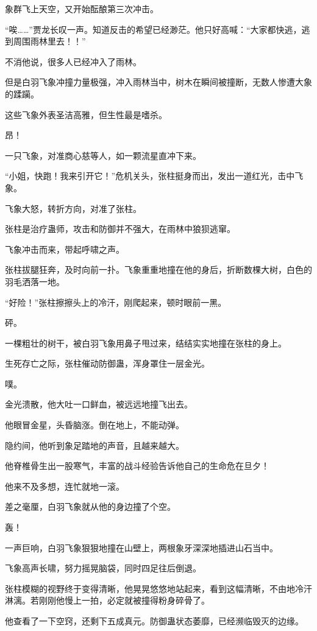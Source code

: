 \begin{this_body}
象群飞上天空，又开始酝酿第三次冲击。

“唉……”贾龙长叹一声。知道反击的希望已经渺茫。他只好高喊：“大家都快逃，逃到周围雨林里去！！”

不消他说，很多人已经冲入了雨林。

但是白羽飞象冲撞力量极强，冲入雨林当中，树木在瞬间被撞断，无数人惨遭大象的蹂躏。

这些飞象外表圣洁高雅，但生性最是嗜杀。

昂！

一只飞象，对准商心慈等人，如一颗流星直冲下来。

“小姐，快跑！我来引开它！”危机关头，张柱挺身而出，发出一道红光，击中飞象。

飞象大怒，转折方向，对准了张柱。

张柱是治疗蛊师，攻击和防御并不强大，在雨林中狼狈逃窜。

飞象冲击而来，带起呼啸之声。

张柱拔腿狂奔，及时向前一扑。飞象重重地撞在他的身后，折断数棵大树，白色的羽毛洒落一地。

“好险！”张柱擦擦头上的冷汗，刚爬起来，顿时眼前一黑。

砰。

一棵粗壮的树干，被白羽飞象用鼻子甩过来，结结实实地撞在张柱的身上。

生死存亡之际，张柱催动防御蛊，浑身罩住一层金光。

噗。

金光溃散，他大吐一口鲜血，被远远地撞飞出去。

他眼冒金星，头昏脑涨。倒在地上，不能动弹。

隐约间，他听到象足踏地的声音，且越来越大。

他脊椎骨生出一股寒气，丰富的战斗经验告诉他自己的生命危在旦夕！

他来不及多想，连忙就地一滚。

差之毫厘，白羽飞象就从他的身边撞了个空。

轰！

一声巨响，白羽飞象狠狠地撞在山壁上，两根象牙深深地插进山石当中。

飞象高声长啸，努力摇晃脑袋，同时四足往后倒退。

张柱模糊的视野终于变得清晰，他晃晃悠悠地站起来，看到这幅清晰，不由地冷汗淋漓。若刚刚他慢上一拍，必定就被撞得粉身碎骨了。

他查看了一下空窍，还剩下五成真元。防御蛊状态萎靡，已经濒临毁灭的边缘。


\end{this_body}
